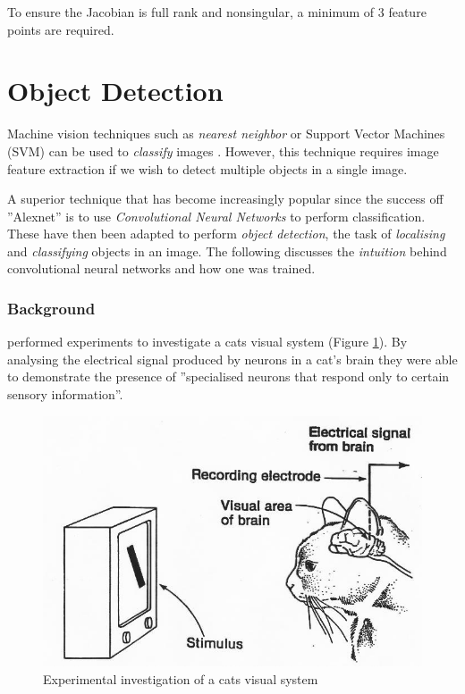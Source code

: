 \documentclass{UoNMCHA}
\numberwithin{equation}{section}
\begin{document}
To ensure the Jacobian is full rank and nonsingular, a minimum of 3 feature points are required. 

\newpage
\section{Object Detection}

Machine vision techniques such as \textit{nearest neighbor} or Support Vector Machines (SVM) can be used to \textit{classify} images \citep{li2009encyclopedia}. However, this technique requires image feature extraction if we wish to detect multiple objects in a single image.

A superior technique that has become increasingly popular since the success off ''Alexnet'' \citep{krizhevsky2012imagenet} is to use \textit{Convolutional Neural Networks} to perform classification. These have then been adapted to perform \textit{object detection}, the task of \textit{localising} and \textit{classifying} objects in an image.  The following discusses the \textit{intuition} behind convolutional neural networks and how one was trained.

\subsubsection{Background}
 
\cite{hubel1959receptive} performed experiments to investigate a cats visual system (Figure \ref{fig:catbrain}). By analysing the electrical signal produced by neurons in a cat's brain they were able to demonstrate the presence of ''specialised neurons that respond only to certain sensory information''.

\begin{figure}[H]
	\begin{center}
		\includegraphics[width=.6\linewidth]{Figures/Catneuron}
		\caption{Experimental investigation of a cats visual system}
		\label{fig:catbrain}
	\end{center}
\end{figure}
\end{document}
